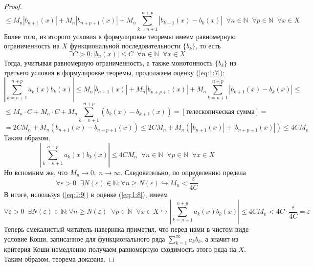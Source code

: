 \documentclass[11pt]{article}
\begin{document}
\begin{proof}
    \begin{equation} \label{eq:1:7}
        \leq M_n \left\lvert b_{n + 1} (x) \right\rvert + M_n \left\lvert b_{n + p + 1} (x) \right\rvert + M_n \sum_{k = n + 1}^{n + p} \left\lvert b_{k + 1} (x) - b_k (x) \right\rvert \; \; \forall n \in \mathbb{N} \; \; \forall p \in \mathbb{N} \; \; \forall x \in X
    \end{equation}
    Более того, из второго условия в формулировке теоремы имеем равномерную ограниченность на $X$ функциональной последовательности $\{b_k\}$, то есть
    \[\exists C > 0: \left\lvert b_n (x) \right\rvert \leq C \; \; \forall n \in \mathbb{N} \; \; \forall x \in X\]
    Тогда, учитывая равномерную ограниченность, а также монотонность $\{b_k\}$ из третьего условия в формулировке теоремы, продолжаем оценку (\ref{eq:1:7}):
    \[\left\lvert \sum_{k = n + 1}^{n + p} a_k (x) b_k (x) \right\rvert \leq M_n \left\lvert b_{n + 1} (x) \right\rvert + M_n \left\lvert b_{n + p + 1} (x) \right\rvert + M_n \sum_{k = n + 1}^{n + p} \left\lvert b_{k + 1} (x) - b_k (x) \right\rvert \leq\]
    \[\leq M_n \cdot C + M_n \cdot C + M_n \sum_{k = n + 1}^{n + p} (b_k (x) - b_{k + 1} (x)) = [\text{телескопическая сумма}] =\]
    \[= 2 C M_n + M_n \left(b_{n + 1} (x) - b_{n + p + 1} (x)\right) \leq 2 C M_n + M_n \left(\left\lvert b_{n + 1} (x) \right\rvert + \left\lvert b_{n + p + 1} (x) \right\rvert \right) \leq 4 C M_n\]
    Таким образом,
    \begin{equation} \label{eq:1:8}
      \left\lvert \sum_{k = n + 1}^{n + p} a_k (x) b_k (x) \right\rvert \leq 4C M_n \; \; \forall n \in \mathbb{N} \; \; \forall p \in \mathbb{N} \; \; \forall x \in X  
    \end{equation}
    Но вспомним же, что $M_n \to 0, \; n \to \infty$. Следовательно, по определению предела
    \begin{equation} \label{eq:1:9}
        \forall \varepsilon > 0 \; \; \exists N(\varepsilon) \in \mathbb{N} : \forall n \geq N(\varepsilon) \hookrightarrow M_n < \frac{\varepsilon}{4C}
    \end{equation}
    В итоге, используя (\ref{eq:1:9}) в оценке (\ref{eq:1:8}), имеем
    \[\forall \varepsilon > 0 \; \; \exists N(\varepsilon) \in \mathbb{N} : \forall n \geq N(\varepsilon) \; \; \forall p \in \mathbb{N} \; \; \forall x \in X \hookrightarrow \left\lvert \sum_{k = n + 1}^{n + p} a_k (x) b_k (x) \right\rvert \leq 4C M_n < 4C \cdot \frac{\varepsilon}{4C} = \varepsilon\] 
    Теперь смекалистый читатель наверняка приметил, что перед нами в чистом виде условие Коши, записанное для функционального ряда $\displaystyle \sum_{k = 1}^{\infty} a_k b_k$, а значит из критерия Коши немедленно получаем равномерную сходимость этого ряда на $X$. Таким образом, теорема доказана.
\end{proof}
\end{document}

